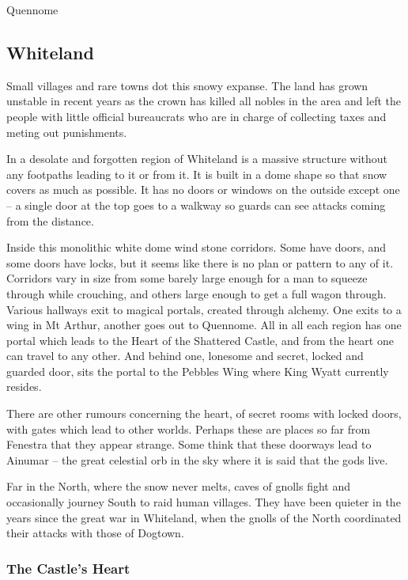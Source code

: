 \begin{multicols}{2}
\begin{encounters}{Quennome}
\end{encounters}

\subsection{Whiteland}

Small villages and rare towns dot this snowy expanse.  The land has grown unstable in recent years as the crown has killed all nobles in the area and left the people with little official bureaucrats who are in charge of collecting taxes and meting out punishments.

In a desolate and forgotten region of Whiteland is a massive structure without any footpaths leading to it or from it.
It is built in a dome shape so that snow covers as much as possible.
It has no doors or windows on the outside except one -- a single door at the top goes to a walkway so guards can see attacks coming from the distance.

Inside this monolithic white dome wind stone corridors.  Some have doors, and some doors have locks, but it seems like there is no plan or pattern to any of it.  Corridors vary in size from some barely large enough for a man to squeeze through while crouching, and others large enough to get a full wagon through.  Various hallways exit to magical portals, created through alchemy.  One exits to a wing in Mt Arthur, another goes out to Quennome.  All in all each region has one portal which leads to the Heart of the Shattered Castle, and from the heart one can travel to any other.  And behind one, lonesome and secret, locked and guarded door, sits the portal to the Pebbles Wing where King Wyatt currently resides.

There are other rumours concerning the heart, of secret rooms with locked doors, with gates which lead to other worlds.  Perhaps these are places so far from Fenestra that they appear strange.  Some think that these doorways lead to Ainumar -- the great celestial orb in the sky where it is said that the gods live.

Far in the North, where the snow never melts, caves of gnolls fight and occasionally journey South to raid human villages.  They have been quieter in the years since the great war in Whiteland, when the gnolls of the North coordinated their attacks with those of Dogtown.

\subsubsection{The Castle's Heart}\label{whiteland_heart}


\end{multicols}
